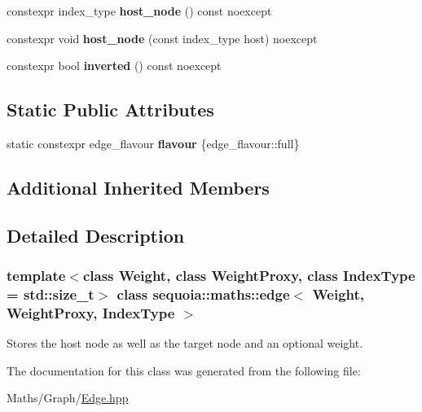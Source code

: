 \begin{DoxyCompactItemize}
\item 
\mbox{\label{classsequoia_1_1maths_1_1edge_accd5566300978f0ab5cdefff7429871d}} 
constexpr index\+\_\+type {\bfseries host\+\_\+node} () const noexcept
\item 
\mbox{\label{classsequoia_1_1maths_1_1edge_aa6d4f40bae9bf9edec570246b4565b54}} 
constexpr void {\bfseries host\+\_\+node} (const index\+\_\+type host) noexcept
\item 
\mbox{\label{classsequoia_1_1maths_1_1edge_aba27d5358d4373090e80d9f44c3cdfba}} 
constexpr bool {\bfseries inverted} () const noexcept
\end{DoxyCompactItemize}
\subsection*{Static Public Attributes}
\begin{DoxyCompactItemize}
\item 
\mbox{\label{classsequoia_1_1maths_1_1edge_a2fcb7b99b6e34d96764fa3765b28690a}} 
static constexpr edge\+\_\+flavour {\bfseries flavour} \{edge\+\_\+flavour\+::full\}
\end{DoxyCompactItemize}
\subsection*{Additional Inherited Members}


\subsection{Detailed Description}
\subsubsection*{template$<$class Weight, class Weight\+Proxy, class Index\+Type = std\+::size\+\_\+t$>$\newline
class sequoia\+::maths\+::edge$<$ Weight, Weight\+Proxy, Index\+Type $>$}

Stores the host node as well as the target node and an optional weight. 

The documentation for this class was generated from the following file\+:\begin{DoxyCompactItemize}
\item 
Maths/\+Graph/\mbox{\hyperlink{_edge_8hpp}{Edge.\+hpp}}\end{DoxyCompactItemize}
